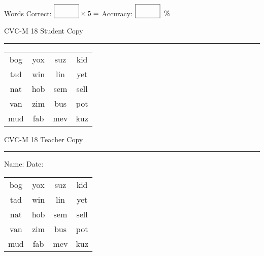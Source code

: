 \documentclass{memoir}
\begin{document}
\small

Words Correct: $\fbox{\phantom{\huge 100}} \times 5 = $ Accuracy: $\fbox{\phantom{\huge 100}}\;\; \%$ 

\vfill

\newpage


\footnotesize \noindent
CVC-M 18 \hfill Student Copy
\smallskip
\hrule

\Large

\setlength{\tabcolsep}{14pt}
\def\arraystretch{2}

{\selectfont


\begin{vplace}[0.5]
\begin{center}
\begin{tabular}{cccc}
bog & yox & suz & kid \\
tad & win & lin & yet \\
nat & hob & sem & sell \\
van & zim & bus & pot \\
mud & fab & mev & kuz \\
\end{tabular}
\end{center}
\end{vplace}

}

\newpage

\footnotesize \noindent
CVC-M 18 \hfill Teacher Copy
\smallskip
\hrule

\small

\vfill

\noindent
Name: \underline{\hspace{1.75in}} \hfill Date: \underline{\hspace{1in}}

\Large

{\selectfont


\begin{vplace}[0.5]
\begin{center}
\begin{tabular}{cccc}
bog & yox & suz & kid \\
tad & win & lin & yet \\
nat & hob & sem & sell \\
van & zim & bus & pot \\
mud & fab & mev & kuz \\
\end{tabular}
\end{center}
\end{vplace}



}
\end{document}
